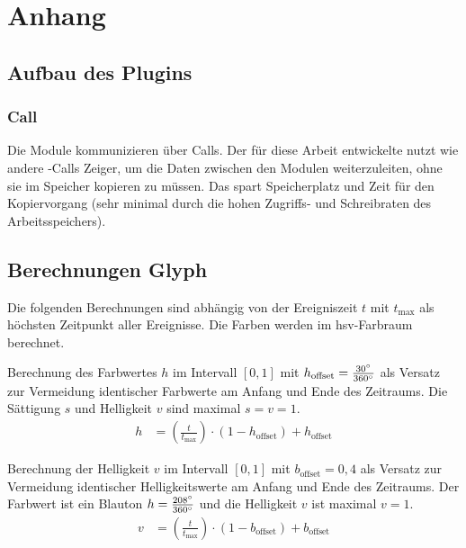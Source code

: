 \appendix

\chapter{Anhang}

\section{Aufbau des Plugins}\label{sec:pluginaufbau}
\subsection{Call}
Die Module kommunizieren über Calls. Der für diese Arbeit entwickelte  nutzt wie andere -Calls Zeiger, um die Daten zwischen den Modulen weiterzuleiten, ohne sie im Speicher kopieren zu müssen. Das spart Speicherplatz und Zeit für den Kopiervorgang (sehr minimal durch die hohen Zugriffs- und Schreibraten des Arbeitsspeichers).

\section{Berechnungen Glyph}\label{sec:berechnungen:glyph}
Die folgenden Berechnungen sind abhängig von der Ereigniszeit $t$ mit $t_{\text{max}}$ als höchsten Zeitpunkt aller Ereignisse. Die Farben werden im \gls{hsv}-Farbraum berechnet.

Berechnung des Farbwertes $h$ im Intervall $[0,1]$ mit $h_{\text{offset}} = \frac{30\degree}{360\degree}$ als Versatz zur Vermeidung identischer Farbwerte am Anfang und Ende des Zeitraums. Die Sättigung $s$ und Helligkeit $v$ sind maximal $s = v = 1$.
\begin{equation}
\begin{aligned}\label{eq:berechnungen:glyph-farbe}
h &= \left(\frac{t}{t_{\text{max}}}\right) \cdot (1 - h_{\text{offset}}) + h_{\text{offset}}
\end{aligned}
\end{equation}

Berechnung der Helligkeit $v$ im Intervall $[0,1]$ mit $b_{\text{offset}} = 0,4$ als Versatz zur Vermeidung identischer Helligkeitswerte am Anfang und Ende des Zeitraums. Der Farbwert ist ein Blauton $h = \frac{208\degree}{360\degree}$ und die Helligkeit $v$ ist maximal $v = 1$.
\begin{equation}
\begin{aligned}\label{eq:berechnungen:glyph-helligkeit}
v &= \left(\frac{t}{t_{\text{max}}}\right) \cdot (1 - b_{\text{offset}}) + b_{\text{offset}}
\end{aligned}
\end{equation}

